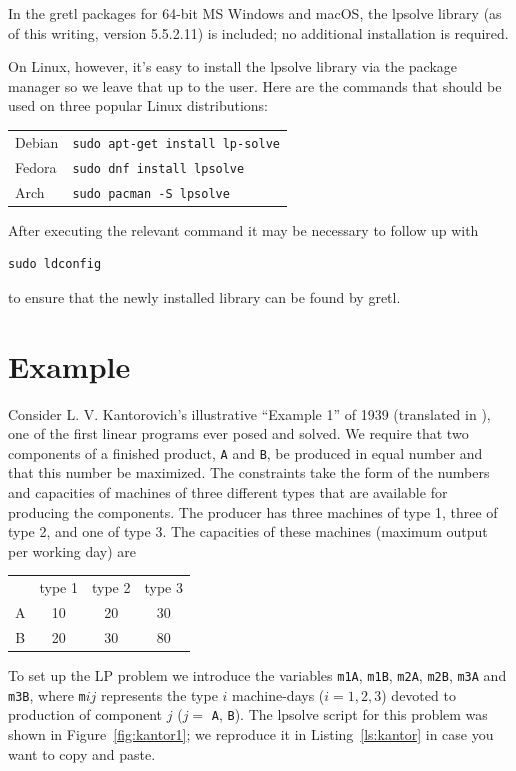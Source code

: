 \documentclass{article}
\begin{document}
In the gretl packages for 64-bit MS Windows and macOS, the
\textsf{lpsolve} library (as of this writing, version 5.5.2.11) is
included; no additional installation is required.

On Linux, however, it's easy to install the \textsf{lpsolve} library
via the package manager so we leave that up to the user. Here are the
commands that should be used on three popular Linux distributions:
\begin{center}
  \begin{tabular}{ll}
  Debian & \texttt{sudo apt-get install lp-solve} \\
  Fedora & \texttt{sudo dnf install lpsolve} \\
  Arch & \texttt{sudo pacman -S lpsolve}
\end{tabular}
\end{center}
After executing the relevant command it may be necessary to follow up
with
\begin{verbatim}
sudo ldconfig
\end{verbatim}
to ensure that the newly installed library can be found by gretl.

\section{Example}
\label{sec:example}

Consider L. V. Kantorovich's illustrative ``Example 1'' of 1939
(translated in \cite{kantorovich60}), one of the first linear programs
ever posed and solved. We require that two components of a finished
product, \texttt{A} and \texttt{B}, be produced in equal number and
that this number be maximized. The constraints take the form of the
numbers and capacities of machines of three different types that are
available for producing the components. The producer has three
machines of type 1, three of type 2, and one of type 3. The capacities
of these machines (maximum output per working day) are

\begin{center}
\begin{tabular}{cccc}
  & type 1 & type 2 & type 3 \\
  A & 10 & 20 & 30 \\
  B & 20 & 30 & 80 
\end{tabular}
\end{center}

To set up the LP problem we introduce the variables \texttt{m1A},
\texttt{m1B}, \texttt{m2A}, \texttt{m2B}, \texttt{m3A} and
\texttt{m3B}, where \texttt{m}$ij$ represents the type $i$
machine-days ($i=1,2,3$) devoted to production of component $j$ ($j=$
\texttt{A}, \texttt{B}).  The \textsf{lpsolve} script for this problem
was shown in Figure~\ref{fig:kantor1}; we reproduce it in
Listing~\ref{ls:kantor} in case you want to copy and paste.
\end{document}
